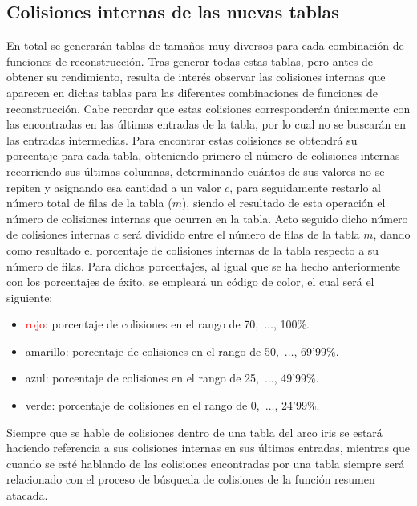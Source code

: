 \documentclass[12pt,spanish,listoffigures,listoftables,listofalgorithms]{tfgetsinf}
\begin{document}
\subsection{Colisiones internas de las nuevas tablas}

En total se generarán tablas de tamaños muy diversos para cada combinación de funciones de reconstrucción. Tras generar todas estas tablas, pero antes de obtener su rendimiento, resulta de interés observar las colisiones internas que aparecen en dichas tablas para las diferentes combinaciones de funciones de reconstrucción. Cabe recordar que estas colisiones corresponderán únicamente con las encontradas en las últimas entradas de la tabla, por lo cual no se buscarán en las entradas intermedias. Para encontrar estas colisiones se obtendrá su porcentaje para cada tabla, obteniendo primero el número de colisiones internas recorriendo sus últimas columnas, determinando cuántos de sus valores no se repiten y asignando esa cantidad a un valor $c$, para seguidamente restarlo al número total de filas de la tabla ($m$), siendo el resultado de esta operación el número de colisiones internas que ocurren en la tabla. Acto seguido dicho número de colisiones internas $c$ será dividido entre el número de filas de la tabla $m$, dando como resultado el porcentaje de colisiones internas de la tabla respecto a su número de filas. Para dichos porcentajes, al igual que se ha hecho anteriormente con los porcentajes de éxito, se empleará un código de color, el cual será el siguiente:

\begin{itemize}

    \item \textcolor{red}{rojo}: porcentaje de colisiones en el rango de 70,~$\dots$, 100\%.
    
    \item \textcolor{y}{amarillo}: porcentaje de colisiones en el rango de 50,~$\dots$, 69'99\%.
    
    \item \textcolor{b}{azul}: porcentaje de colisiones en el rango de 25,~$\dots$, 49'99\%.

    \item \textcolor{g}{verde}: porcentaje de colisiones en el rango de 0,~$\dots$, 24'99\%.
    
\end{itemize}

Siempre que se hable de colisiones dentro de una tabla del arco iris se estará haciendo referencia a sus colisiones internas en sus últimas entradas, mientras que cuando se esté hablando de las colisiones encontradas por una tabla siempre será relacionado con el proceso de búsqueda de colisiones de la función resumen atacada.
\end{document}
